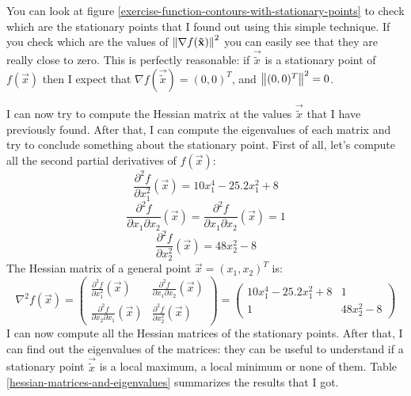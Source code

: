     You can look at figure \ref{exercise-function-contours-with-stationary-points} to check which are the stationary points that I found out using this simple technique. If you check which are the values of \(\left\lVert\nabla f(\mathbf{\tilde{x}})\right\rVert^2\) you can easily see that they are really close to zero. This is perfectly reasonable: if \(\vec{\tilde{x}}\) is a stationary point of \(f(\vec{x})\) then I expect that \(\nabla f(\vec{\tilde{x}}) = (0, 0)^T\), and \(\left\lVert(0,0)^T\right\rVert^2 = 0\).\par
    I can now try to compute the Hessian matrix at the values \(\vec{\tilde{x}}\) that I have previously found. After that, I can compute the eigenvalues of each matrix and try to conclude something about the stationary point. First of all, let's compute all the second partial derivatives of \(f(\vec{x})\):
    \[\frac{\partial^2 f}{\partial x_1^2}(\vec{x}) = 10x_1^4 - 25.2x_1^2 + 8\]
    \[\frac{\partial^2 f}{\partial x_1 \partial x_2}(\vec{x}) = \frac{\partial^2 f}{\partial x_1 \partial x_2}(\vec{x}) = 1\]
    \[\frac{\partial^2 f}{\partial x_2^2}(\vec{x}) = 48x_2^2 - 8\]
    The Hessian matrix of a general point \(\vec{x} = (x_1, x_2)^T\) is:
    \[
        \nabla^2 f(\vec{x}) =
        \begin{pmatrix}
            \frac{\partial^2 f}{\partial x_1^2}(\vec{x}) &
            \frac{\partial^2 f}{\partial x_1 \partial x_2}(\vec{x}) \\
            \frac{\partial^2 f}{\partial x_2 \partial x_1}(\vec{x}) &
            \frac{\partial^2 f}{\partial x_2^2}(\vec{x})
        \end{pmatrix}
        =
        \begin{pmatrix}
            10x_1^4 - 25.2x_1^2 + 8 & 1 \\
            1 & 48x_2^2 - 8
        \end{pmatrix}
    \]
    I can now compute all the Hessian matrices of the stationary points. After that, I can find out the eigenvalues of the matrices: they can be useful to understand if a stationary point \(\vec{\tilde{x}}\) is a local maximum, a local minimum or none of them. Table \ref{hessian-matrices-and-eigenvalues} summarizes the results that I got.
